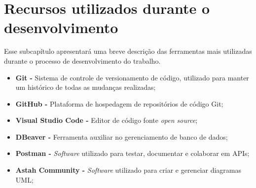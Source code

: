 \section{Recursos utilizados durante o desenvolvimento}
\label{sec:recursos}

Esse subcapítulo apresentará uma breve descrição das ferramentas mais utilizadas durante o processo de desenvolvimento do trabalho.
\begin{itemize}
    \item \textbf{Git -} Sistema de controle de versionamento de código, utilizado para manter um histórico de todas as mudanças realizadas;
    \item \textbf{GitHub -} Plataforma de hospedagem de repositórios de código Git;
    \item \textbf{Visual Studio Code -} Editor de código fonte \textit{open source};
    \item \textbf{DBeaver -} Ferramenta auxiliar no gerenciamento de banco de dados;
    \item \textbf{Postman -} \textit{Software} utilizado para testar, documentar e colaborar em APIs;
    \item \textbf{Astah Community -} \textit{Software} utilizado para criar e gerenciar diagramas UML;
\end{itemize}